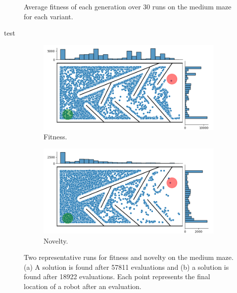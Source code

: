 \begin{figure}[H]
    \begin{center}
        
    \end{center}
    \caption{Average fitness of each generation over 30 runs on the medium maze for each variant.}
    \label{medium_fitness}
\end{figure}
test
\begin{figure}[H]
    \begin{mdframed}
        \begin{subfigure}[b]{0.45\textwidth}
            \includegraphics[scale=0.3]{resources/mazes/pure_fitness_medium_single.png}
            \caption{Fitness.}
            \label{fitness_only}
        \end{subfigure}
        \begin{subfigure}[b]{0.5\textwidth}
            \includegraphics[scale=0.3]{resources/mazes/pure_novelty_medium_single.png}
            \caption{Novelty.}
            \label{novelty_only}
        \end{subfigure}
    \end{mdframed}
    \caption{Two representative runs for fitness and novelty on the medium maze. (a) A solution is found after 57811 evaluations
    and (b) a solution is found after 18922 evaluations. Each point represents the final location
    of a robot after an evaluation.}
    \label{typical_runs}
\end{figure}

